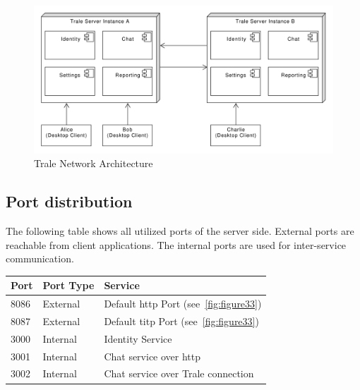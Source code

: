 \begin{figure}[H]
    \centering
    \includegraphics[width=1.0\textwidth]{./graphics/components}
    \caption{Trale Network Architecture}
    \label{fig:figure32}
\end{figure}

\subsection{Port distribution}\label{subsec:port-distribution}

The following table shows all utilized ports of the server side.
External ports are reachable from client applications.
The internal ports are used for inter-service communication.

\begin{table}[H]
    \centering
    \begin{tabular}{|l|l|l|}
        \toprule
        \textbf{Port} & \textbf{Port Type} & \textbf{Service}                               \\
        \midrule
        8086          & External & Default \ac{http} Port (see~\ref{fig:figure33})     \\
        \midrule
        8087          & External & Default \ac{titp} Port (see~\ref{fig:figure33})     \\
        \midrule
        3000          & Internal & Identity Service                               \\
        \midrule
        3001          & Internal & Chat service over \ac{http}                         \\
        \midrule
        3002          & Internal & Chat service over Trale connection \\
        \bottomrule
    \end{tabular}\label{tab:table}
\end{table}

